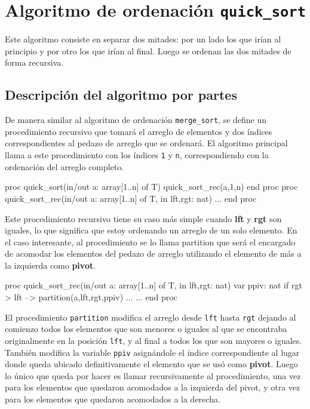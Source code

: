 \section{Algoritmo de ordenación \texttt{quick\_sort}}
Este algoritmo consiste en separar dos mitades: por un lado los que irían al principio y por otro los que irían al final. Luego se ordenan las dos mitades de forma recursiva.\\

\subsection{Descripción del algoritmo por partes}
De manera similar al algoritmo de ordenación \texttt{merge\_sort}, se define un procedimiento recursivo que tomará el arreglo de elementos y dos índices correspondientes al pedazo de arreglo que se ordenará. El algoritmo principal llama a este procedimiento con los índices \texttt{1} y \texttt{n}, correspondiendo con la ordenación del arreglo completo.
\begin{pascallike}
proc quick_sort(in/out a: array[1..n] of T)
    quick_sort_rec(a,1,n)
end proc
proc quick_sort_rec(in/out a: array[1..n] of T, in lft,rgt: nat)
...
end proc
\end{pascallike}
Este procedimiento recursivo tiene su caso más simple cuando \textbf{lft} y \textbf{rgt} son iguales, lo que significa que estoy ordenando un arreglo de un solo elemento. En el caso interesante, al procedimiento se lo llama partition que será el encargado de acomodar los elementos del pedazo de arreglo utilizando el elemento de más a la izquierda como \textbf{pivot}.
\begin{pascallike}
proc quick_sort_rec(in/out a: array[1..n] of T, in lft,rgt: nat)
    var ppiv: nat
    if rgt > lft --> 
        partition(a,lft,rgt,ppiv)
    ...
...
end proc
\end{pascallike}
El procedimiento \texttt{partition} modifica el arreglo desde \texttt{lft} hasta \texttt{rgt} dejando al comienzo todos los elementos que son menores o iguales al que se encontraba originalmente en la posición \texttt{lft}, y al final a todos los que son mayores o iguales. También modifica la variable \texttt{ppiv} asignándole el índice correspondiente al lugar donde queda ubicado definitivamente el elemento que se usó como \textbf{pivot}.
Luego lo único que queda por hacer es llamar recursivamente al procedimiento, una vez para los elementos que quedaron acomodados a la izquierda del pivot, y otra vez para los elementos que quedaron acomodados a la derecha.
